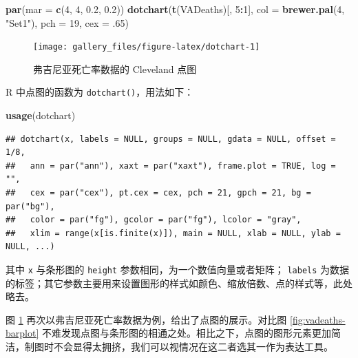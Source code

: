 \documentclass[
  b5paper,
  UTF8,twoside]{book}
\newenvironment{Shaded}{\begin{snugshade}}{\end{snugshade}}
\newcommand{\AttributeTok}[1]{\textcolor[rgb]{0.13,0.29,0.53}{#1}}
\newcommand{\DecValTok}[1]{\textcolor[rgb]{0.00,0.00,0.81}{#1}}
\newcommand{\FloatTok}[1]{\textcolor[rgb]{0.00,0.00,0.81}{#1}}
\newcommand{\FunctionTok}[1]{\textcolor[rgb]{0.13,0.29,0.53}{\textbf{#1}}}
\newcommand{\NormalTok}[1]{#1}
\newcommand{\SpecialCharTok}[1]{\textcolor[rgb]{0.81,0.36,0.00}{\textbf{#1}}}
\newcommand{\StringTok}[1]{\textcolor[rgb]{0.31,0.60,0.02}{#1}}
\begin{document}
\begin{Shaded}
\begin{Highlighting}[]
\FunctionTok{par}\NormalTok{(}\AttributeTok{mar =} \FunctionTok{c}\NormalTok{(}\DecValTok{4}\NormalTok{, }\DecValTok{4}\NormalTok{, }\FloatTok{0.2}\NormalTok{, }\FloatTok{0.2}\NormalTok{))}
\FunctionTok{dotchart}\NormalTok{(}\FunctionTok{t}\NormalTok{(VADeaths)[, }\DecValTok{5}\SpecialCharTok{:}\DecValTok{1}\NormalTok{], }\AttributeTok{col =} \FunctionTok{brewer.pal}\NormalTok{(}\DecValTok{4}\NormalTok{, }\StringTok{"Set1"}\NormalTok{), }\AttributeTok{pch =} \DecValTok{19}\NormalTok{, }\AttributeTok{cex =}\NormalTok{ .}\DecValTok{65}\NormalTok{)}
\end{Highlighting}
\end{Shaded}

\begin{figure}

{\centering \texttt{[image: gallery\_files/figure-latex/dotchart-1]} 

}

\caption[弗吉尼亚死亡率数据的 Cleveland 点图]{弗吉尼亚死亡率数据的 Cleveland 点图}\label{fig:dotchart}
\end{figure}

R 中点图的函数为 \texttt{dotchart()}，用法如下：

\begin{Shaded}
\begin{Highlighting}[]
\FunctionTok{usage}\NormalTok{(dotchart)}
\end{Highlighting}
\end{Shaded}

\begin{verbatim}
## dotchart(x, labels = NULL, groups = NULL, gdata = NULL, offset = 1/8,
##   ann = par("ann"), xaxt = par("xaxt"), frame.plot = TRUE, log = "",
##   cex = par("cex"), pt.cex = cex, pch = 21, gpch = 21, bg = par("bg"),
##   color = par("fg"), gcolor = par("fg"), lcolor = "gray",
##   xlim = range(x[is.finite(x)]), main = NULL, xlab = NULL, ylab = NULL, ...)
\end{verbatim}

其中 \texttt{x} 与条形图的 \texttt{height} 参数相同，为一个数值向量或者矩阵； \texttt{labels} 为数据的标签；其它参数主要用来设置图形的样式如颜色、缩放倍数、点的样式等，此处略去。

图 \ref{fig:dotchart} 再次以弗吉尼亚死亡率数据为例，给出了点图的展示。对比图 \ref{fig:vadeaths-barplot} 不难发现点图与条形图的相通之处。相比之下，点图的图形元素更加简洁，制图时不会显得太拥挤，我们可以视情况在这二者选其一作为表达工具。
\end{document}
